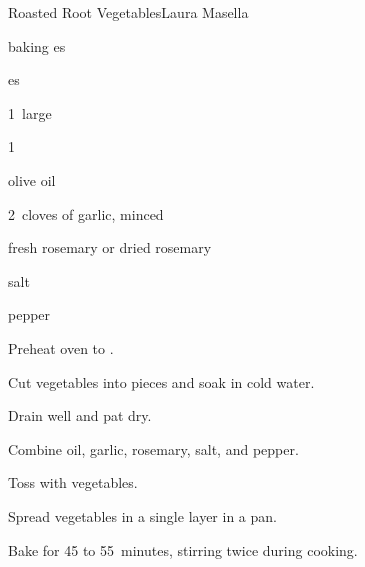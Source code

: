 \begin{recipe}{Roasted Root Vegetables}{Laura Masella}{}

\begin{ingredients}
\item {} baking es
\item {} es
\item 1~large 
\item 1~
\item \lbs{\quarter} 
\item \Tp{1\half} olive oil
\item 2~cloves of garlic, minced
\item {} fresh rosemary or  dried rosemary
\item \tp{\half} salt
\item \tp{\half} pepper
\end{ingredients}

\begin{directions}
\item Preheat oven to .
\item Cut vegetables into \inch{1\half} pieces and soak in cold water.
\item Drain well and pat dry.
\item Combine oil, garlic, rosemary, salt, and pepper.
\item Toss with vegetables.
\item Spread vegetables in a single layer in a pan.
\item Bake for 45 to 55~minutes, stirring twice during cooking.
\end{directions}

\end{recipe}
